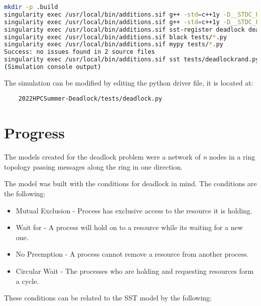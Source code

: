 \documentclass{article}
\begin{document}
\begin{lstlisting}[language=bash, frame=none]
mkdir -p .build
singularity exec /usr/local/bin/additions.sif g++ -std=c++1y -D__STDC_FORMAT_MACROS -fPIC -DHAVE_CONFIG_H -I/opt/SST/11.1.0/include -MMD -c node.cc -o .build/node.o
singularity exec /usr/local/bin/additions.sif g++ -std=c++1y -D__STDC_FORMAT_MACROS -fPIC -DHAVE_CONFIG_H -I/opt/SST/11.1.0/include -shared -fno-common -Wl,-undefined -Wl,dynamic_lookup -o libdeadlock.so .build/node.o
singularity exec /usr/local/bin/additions.sif sst-register deadlock deadlock_LIBDIR=/home/{USER}/sst-work/2022HPCSummer-Deadlock/deadlock
singularity exec /usr/local/bin/additions.sif black tests/*.py
singularity exec /usr/local/bin/additions.sif mypy tests/*.py
Success: no issues found in 2 source files
singularity exec /usr/local/bin/additions.sif sst tests/deadlockrand.py
(Simulation console output)
\end{lstlisting}

\noindent The simulation can be modified by editing the python driver file, it is located at:

\begin{verbatim}
	2022HPCSummer-Deadlock/tests/deadlock.py
\end{verbatim}

\section{Progress}
The models created for the deadlock problem were a network of \textit{n} nodes in a ring topology passing messages along the ring in one direction.

The model was built with the conditions for deadlock in mind. The conditions are the following\cite[p. 70]{1971_Coffman}:

\begin{itemize}
	\item Mutual Exclusion - Process has exclusive access to the resource it is holding.
	\item Wait for - A process will hold on to a resource while its waiting for a new one.
	\item No Preemption - A process cannot remove a resource from another process.
	\item Circular Wait - The processes who are holding and requesting resources form a cycle. \newline
\end{itemize}

These conditions can be related to the SST model by the following:
\end{document}
